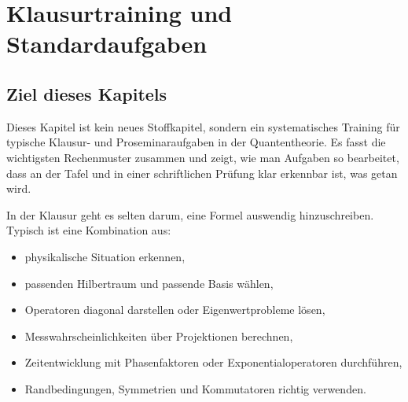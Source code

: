 \providecommand{\ket}[1]{\left|#1\right\rangle}
\providecommand{\bra}[1]{\left\langle#1\right|}
\providecommand{\braket}[2]{\left\langle#1\middle|#2\right\rangle}
\providecommand{\mel}[3]{\left\langle#1\middle|#2\middle|#3\right\rangle}
\providecommand{\proj}[1]{\left|#1\right\rangle\left\langle#1\right|}
\providecommand{\ii}{\mathrm{i}}
\providecommand{\e}{\mathrm{e}}
\providecommand{\dd}{\mathrm{d}}
\providecommand{\idop}{\mathbf{1}}
\providecommand{\opH}{\hat H}
\providecommand{\opA}{\hat A}
\providecommand{\opB}{\hat B}
\providecommand{\opC}{\hat C}
\providecommand{\opV}{\hat V}
\providecommand{\opX}{\hat X}
\providecommand{\opP}{\hat P}
\providecommand{\opL}{\hat L}
\providecommand{\Tr}{\operatorname{Tr}}
\providecommand{\sgn}{\operatorname{sgn}}

\chapter{Klausurtraining und Standardaufgaben}

\section{Ziel dieses Kapitels}

Dieses Kapitel ist kein neues Stoffkapitel, sondern ein systematisches Training für typische Klausur- und Proseminaraufgaben in der Quantentheorie. Es fasst die wichtigsten Rechenmuster zusammen und zeigt, wie man Aufgaben so bearbeitet, dass an der Tafel und in einer schriftlichen Prüfung klar erkennbar ist, was getan wird.

\begin{conceptbox}
In der Klausur geht es selten darum, eine Formel auswendig hinzuschreiben. Typisch ist eine Kombination aus:
\begin{itemize}
    \item physikalische Situation erkennen,
    \item passenden Hilbertraum und passende Basis wählen,
    \item Operatoren diagonal darstellen oder Eigenwertprobleme lösen,
    \item Messwahrscheinlichkeiten über Projektionen berechnen,
    \item Zeitentwicklung mit Phasenfaktoren oder Exponentialoperatoren durchführen,
    \item Randbedingungen, Symmetrien und Kommutatoren richtig verwenden.
\end{itemize}
\end{conceptbox}

